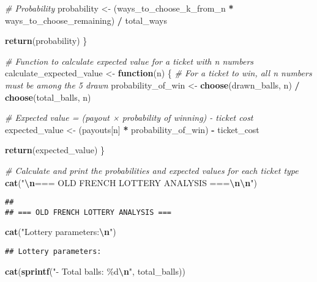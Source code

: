 \documentclass[
]{article}
\newenvironment{Shaded}{\begin{snugshade}}{\end{snugshade}}
\newcommand{\CommentTok}[1]{\textcolor[rgb]{0.56,0.35,0.01}{\textit{#1}}}
\newcommand{\ControlFlowTok}[1]{\textcolor[rgb]{0.13,0.29,0.53}{\textbf{#1}}}
\newcommand{\FunctionTok}[1]{\textcolor[rgb]{0.13,0.29,0.53}{\textbf{#1}}}
\newcommand{\NormalTok}[1]{#1}
\newcommand{\OtherTok}[1]{\textcolor[rgb]{0.56,0.35,0.01}{#1}}
\newcommand{\SpecialCharTok}[1]{\textcolor[rgb]{0.81,0.36,0.00}{\textbf{#1}}}
\newcommand{\StringTok}[1]{\textcolor[rgb]{0.31,0.60,0.02}{#1}}
\begin{document}
\begin{Shaded}
\begin{Highlighting}[]
  \CommentTok{\# Probability}
\NormalTok{  probability }\OtherTok{\textless{}{-}}\NormalTok{ (ways\_to\_choose\_k\_from\_n }\SpecialCharTok{*}\NormalTok{ ways\_to\_choose\_remaining) }\SpecialCharTok{/}\NormalTok{ total\_ways}
  
  \FunctionTok{return}\NormalTok{(probability)}
\NormalTok{\}}

\CommentTok{\# Function to calculate expected value for a ticket with n numbers}
\NormalTok{calculate\_expected\_value }\OtherTok{\textless{}{-}} \ControlFlowTok{function}\NormalTok{(n) \{}
  \CommentTok{\# For a ticket to win, all n numbers must be among the 5 drawn}
\NormalTok{  probability\_of\_win }\OtherTok{\textless{}{-}} \FunctionTok{choose}\NormalTok{(drawn\_balls, n) }\SpecialCharTok{/} \FunctionTok{choose}\NormalTok{(total\_balls, n)}
  
  \CommentTok{\# Expected value = (payout × probability of winning) {-} ticket cost}
\NormalTok{  expected\_value }\OtherTok{\textless{}{-}}\NormalTok{ (payouts[n] }\SpecialCharTok{*}\NormalTok{ probability\_of\_win) }\SpecialCharTok{{-}}\NormalTok{ ticket\_cost}
  
  \FunctionTok{return}\NormalTok{(expected\_value)}
\NormalTok{\}}

\CommentTok{\# Calculate and print the probabilities and expected values for each ticket type}
\FunctionTok{cat}\NormalTok{(}\StringTok{"}\SpecialCharTok{\textbackslash{}n}\StringTok{=== OLD FRENCH LOTTERY ANALYSIS ===}\SpecialCharTok{\textbackslash{}n\textbackslash{}n}\StringTok{"}\NormalTok{)}
\end{Highlighting}
\end{Shaded}

\begin{verbatim}
## 
## === OLD FRENCH LOTTERY ANALYSIS ===
\end{verbatim}

\begin{Shaded}
\begin{Highlighting}[]
\FunctionTok{cat}\NormalTok{(}\StringTok{"Lottery parameters:}\SpecialCharTok{\textbackslash{}n}\StringTok{"}\NormalTok{)}
\end{Highlighting}
\end{Shaded}

\begin{verbatim}
## Lottery parameters:
\end{verbatim}

\begin{Shaded}
\begin{Highlighting}[]
\FunctionTok{cat}\NormalTok{(}\FunctionTok{sprintf}\NormalTok{(}\StringTok{"{-} Total balls: \%d}\SpecialCharTok{\textbackslash{}n}\StringTok{"}\NormalTok{, total\_balls))}
\end{Highlighting}
\end{Shaded}
\end{document}
